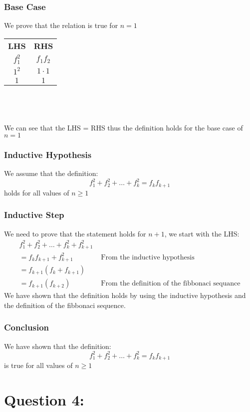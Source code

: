 \documentclass{article}
\begin{document}
\subsubsection*{Base Case}
We prove that the relation is true for $n=1$
\begin{table}[htp]
\centering
\begin{tabular}{cc}
  \textbf{LHS} & \textbf{RHS}  \\
  $f_{1}^{2}$ & $f_{1}f_{2}$  \\
  $1^{2}$& $1\cdot 1$\\
  $1$&$1$
\end{tabular}
\end{table}
 \\\\\\
We can see that the LHS = RHS thus the definition holds for the base case of $n=1$

\subsubsection*{Inductive Hypothesis}
We assume that the definition: $$f_{1}^{2}+f_{2}^{2}+\dots+f_{k}^{2}=f_{k}f_{k+1}$$
holds for all values of $n\geq 1$

\subsubsection*{Inductive Step}
We need to prove that the statement holds for $n+1$, we start with the LHS:
$$\begin{aligned}
f_{1}^{2}+f_{2}^{2}+\dots+f_{k}^{2}+f_{k+1}^{2} &\\
=f_{k}f_{k+1}+f_{k+1}^{2} & \text{   From the inductive hypothesis}\\
=f_{k+1}(f_{k}+f_{k+1})\\
=f_{k+1}(f_{k+2}) & \text{     From the definition of the fibbonaci sequance}
\end{aligned}$$
We have shown that the definition holds by using the inductive hypothesis and the definition of the fibbonaci sequence.
\subsubsection*{Conclusion}
We have shown that the definition:$$f_{1}^{2}+f_{2}^{2}+\dots+f_{k}^{2}=f_{k}f_{k+1}$$ is true for all values of $n\geq 1$
\newpage
\section*{Question 4:}
\end{document}
